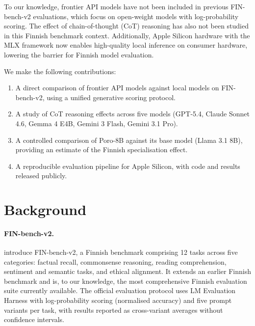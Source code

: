 \documentclass[11pt]{article}
\begin{document}
To our knowledge, frontier API models have not been included in previous
FIN-bench-v2 evaluations, which focus on open-weight models with
log-probability scoring.
The effect of chain-of-thought (CoT) reasoning has also not been studied
in this Finnish benchmark context.
Additionally, Apple Silicon hardware with the MLX framework
\cite{hannun2023mlx} now enables high-quality local inference on
consumer hardware, lowering the barrier for Finnish model evaluation.

We make the following contributions:
\begin{enumerate}
  \item A direct comparison of frontier API models against local
        models on FIN-bench-v2, using a unified generative scoring protocol.
  \item A study of CoT reasoning effects across five models
        (GPT-5.4, Claude Sonnet 4.6, Gemma 4 E4B, Gemini 3 Flash, Gemini 3.1 Pro).
  \item A controlled comparison of Poro-8B against its base model
        (Llama 3.1 8B), providing an estimate of the Finnish
        specialisation effect.
  \item A reproducible evaluation pipeline for Apple Silicon, with code and
        results released publicly.
\end{enumerate}

\section{Background}

\paragraph{FIN-bench-v2.}
\citet{kytoniemi2025} introduce FIN-bench-v2, a Finnish benchmark comprising
12 tasks across five categories: factual recall, commonsense reasoning,
reading comprehension, sentiment and semantic tasks, and ethical alignment.
It extends an earlier Finnish benchmark \cite{luukkonen2023fingpt} and is,
to our knowledge, the most comprehensive Finnish evaluation suite currently
available.
The official evaluation protocol uses LM Evaluation Harness with
log-probability scoring (normalised accuracy) and five prompt variants per task,
with results reported as cross-variant averages without confidence intervals.
\end{document}
